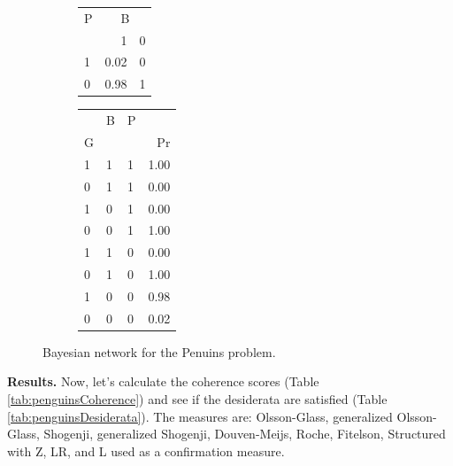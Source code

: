 \documentclass[
  10pt,
]{scrartcl}
\begin{document}
\begin{figure}[H]
{\begin{subfigure}[!ht]{0.4\textwidth}
\begin{tabular}{lrr}
\toprule
\multicolumn{1}{c}{P} & \multicolumn{2}{c}{B} \\
  & 1 & 0\\
\midrule
1 & 0.02 & 0\\
0 & 0.98 & 1\\
\bottomrule
\end{tabular}


\begin{tabular}{lllr}
\toprule
\multicolumn{1}{c}{} & \multicolumn{1}{c}{B} & \multicolumn{1}{c}{P} & \multicolumn{1}{c}{} \\
G &  &  & Pr\\
\midrule
1 & 1 & 1 & 1.00\\
0 & 1 & 1 & 0.00\\
1 & 0 & 1 & 0.00\\
0 & 0 & 1 & 1.00\\
1 & 1 & 0 & 0.00\\
0 & 1 & 0 & 1.00\\
1 & 0 & 0 & 0.98\\
0 & 0 & 0 & 0.02\\
\bottomrule
\end{tabular}
\end{subfigure}}
\caption{Bayesian network for the Penuins problem.}
\label{fig:BGP}
\end{figure}

\noindent \textbf{Results.} Now, let's calculate the coherence scores (Table \ref{tab:penguinsCoherence}) and see if the desiderata are satisfied (Table \ref{tab:penguinsDesiderata}). The measures are: Olsson-Glass, generalized Olsson-Glass, Shogenji, generalized Shogenji, Douven-Meijs, Roche, Fitelson, Structured with Z, LR, and L used as a confirmation measure.
\end{document}
